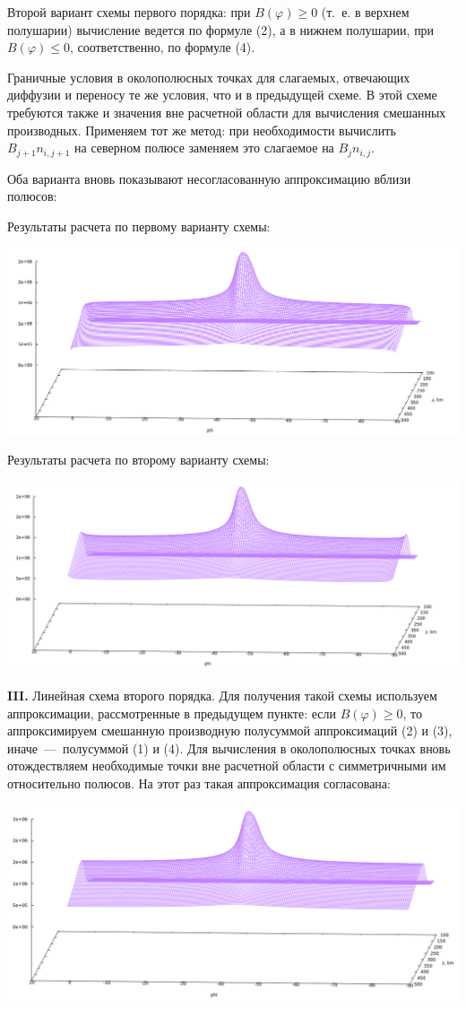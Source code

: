 \documentclass[2pt, a4paper, fleqn]{extarticle}
\let\leq\leqslant
\let\geq\geqslant
\begin{document}
Второй вариант схемы первого порядка: при $B(\varphi) \geq 0$ (т.~е. в верхнем полушарии) вычисление ведется по формуле (2), а в нижнем полушарии, при $B(\varphi) \leq 0$, соответственно, по формуле (4).

Граничные условия в околополюсных точках для слагаемых, отвечающих диффузии и переносу те же условия, что и в предыдущей схеме. В этой схеме требуются также и значения вне расчетной области для вычисления смешанных производных. Применяем тот же метод: при необходимости вычислить $B_{j+1} n_{i, j+1}$ на северном полюсе заменяем это слагаемое на $B_{j} n_{i, j}$.

Оба варианта вновь показывают несогласованную аппроксимацию вблизи полюсов:

Результаты расчета по первому варианту схемы:

\includegraphics[scale=0.5]{linear_1st_order_1}

Результаты расчета по второму варианту схемы:

\includegraphics[scale=0.5]{linear_1st_order_2}

\newpage



{\bf III.} Линейная схема второго порядка. Для получения такой схемы используем аппроксимации, рассмотренные в предыдущем пункте: если $B(\varphi) \geq 0$, то аппроксимируем смешанную производную полусуммой аппроксимаций (2) и (3), иначе~---~полусуммой (1) и (4). Для вычисления в околополюсных точках вновь отождествляем необходимые точки вне расчетной области с симметричными им относительно полюсов. На этот раз такая аппроксимация согласована: 

\includegraphics[scale=0.5]{linear_2st_order}
\end{document}
